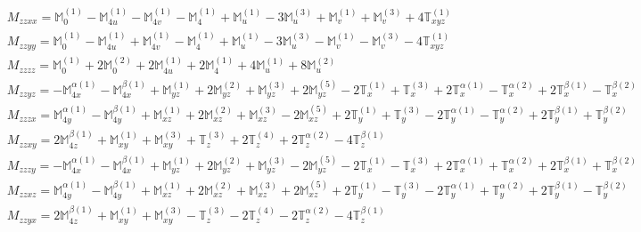 \documentclass[fleqn,8pt,landscape]{jsarticle}
\begin{document}
\begin{align*}
& M_{zzxx} = \mathbb{M}_{0}^{(1)} - \mathbb{M}_{4u}^{(1)} - \mathbb{M}_{4v}^{(1)} - \mathbb{M}_{4}^{(1)} + \mathbb{M}_{u}^{(1)} - 3 \mathbb{M}_{u}^{(3)} + \mathbb{M}_{v}^{(1)} + \mathbb{M}_{v}^{(3)} + 4 \mathbb{T}_{xyz}^{(1)} \\
& M_{zzyy} = \mathbb{M}_{0}^{(1)} - \mathbb{M}_{4u}^{(1)} + \mathbb{M}_{4v}^{(1)} - \mathbb{M}_{4}^{(1)} + \mathbb{M}_{u}^{(1)} - 3 \mathbb{M}_{u}^{(3)} - \mathbb{M}_{v}^{(1)} - \mathbb{M}_{v}^{(3)} - 4 \mathbb{T}_{xyz}^{(1)} \\
& M_{zzzz} = \mathbb{M}_{0}^{(1)} + 2 \mathbb{M}_{0}^{(2)} + 2 \mathbb{M}_{4u}^{(1)} + 2 \mathbb{M}_{4}^{(1)} + 4 \mathbb{M}_{u}^{(1)} + 8 \mathbb{M}_{u}^{(2)} \\
& M_{zzyz} = - \mathbb{M}_{4x}^{\alpha(1)} - \mathbb{M}_{4x}^{\beta(1)} + \mathbb{M}_{yz}^{(1)} + 2 \mathbb{M}_{yz}^{(2)} + \mathbb{M}_{yz}^{(3)} + 2 \mathbb{M}_{yz}^{(5)} - 2 \mathbb{T}_{x}^{(1)} + \mathbb{T}_{x}^{(3)} + 2 \mathbb{T}_{x}^{\alpha(1)} - \mathbb{T}_{x}^{\alpha(2)} + 2 \mathbb{T}_{x}^{\beta(1)} - \mathbb{T}_{x}^{\beta(2)} \\
& M_{zzzx} = \mathbb{M}_{4y}^{\alpha(1)} - \mathbb{M}_{4y}^{\beta(1)} + \mathbb{M}_{xz}^{(1)} + 2 \mathbb{M}_{xz}^{(2)} + \mathbb{M}_{xz}^{(3)} - 2 \mathbb{M}_{xz}^{(5)} + 2 \mathbb{T}_{y}^{(1)} + \mathbb{T}_{y}^{(3)} - 2 \mathbb{T}_{y}^{\alpha(1)} - \mathbb{T}_{y}^{\alpha(2)} + 2 \mathbb{T}_{y}^{\beta(1)} + \mathbb{T}_{y}^{\beta(2)} \\
& M_{zzxy} = 2 \mathbb{M}_{4z}^{\beta(1)} + \mathbb{M}_{xy}^{(1)} + \mathbb{M}_{xy}^{(3)} + \mathbb{T}_{z}^{(3)} + 2 \mathbb{T}_{z}^{(4)} + 2 \mathbb{T}_{z}^{\alpha(2)} - 4 \mathbb{T}_{z}^{\beta(1)} \\
& M_{zzzy} = - \mathbb{M}_{4x}^{\alpha(1)} - \mathbb{M}_{4x}^{\beta(1)} + \mathbb{M}_{yz}^{(1)} + 2 \mathbb{M}_{yz}^{(2)} + \mathbb{M}_{yz}^{(3)} - 2 \mathbb{M}_{yz}^{(5)} - 2 \mathbb{T}_{x}^{(1)} - \mathbb{T}_{x}^{(3)} + 2 \mathbb{T}_{x}^{\alpha(1)} + \mathbb{T}_{x}^{\alpha(2)} + 2 \mathbb{T}_{x}^{\beta(1)} + \mathbb{T}_{x}^{\beta(2)} \\
& M_{zzxz} = \mathbb{M}_{4y}^{\alpha(1)} - \mathbb{M}_{4y}^{\beta(1)} + \mathbb{M}_{xz}^{(1)} + 2 \mathbb{M}_{xz}^{(2)} + \mathbb{M}_{xz}^{(3)} + 2 \mathbb{M}_{xz}^{(5)} + 2 \mathbb{T}_{y}^{(1)} - \mathbb{T}_{y}^{(3)} - 2 \mathbb{T}_{y}^{\alpha(1)} + \mathbb{T}_{y}^{\alpha(2)} + 2 \mathbb{T}_{y}^{\beta(1)} - \mathbb{T}_{y}^{\beta(2)} \\
& M_{zzyx} = 2 \mathbb{M}_{4z}^{\beta(1)} + \mathbb{M}_{xy}^{(1)} + \mathbb{M}_{xy}^{(3)} - \mathbb{T}_{z}^{(3)} - 2 \mathbb{T}_{z}^{(4)} - 2 \mathbb{T}_{z}^{\alpha(2)} - 4 \mathbb{T}_{z}^{\beta(1)} \\

\end{align*}
\end{document}
